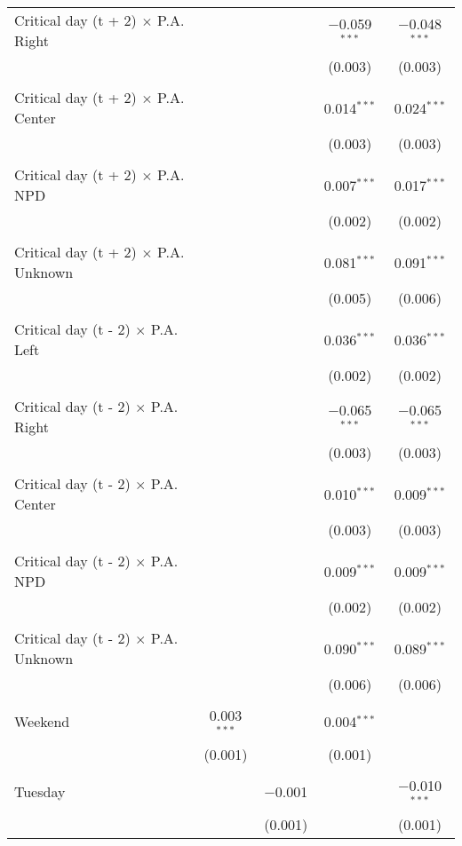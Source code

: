 \documentclass[
]{article}
\begin{document}
\begin{table}[!htbp]
{\begin{tabular}{@{\extracolsep{5pt}}lcccc}
 Critical day (t + 2) $\times$ P.A. Right &  &  & $-$0.059$^{***}$ & $-$0.048$^{***}$ \\ 
  &  &  & (0.003) & (0.003) \\ 
  & & & & \\ 
 Critical day (t + 2) $\times$ P.A. Center &  &  & 0.014$^{***}$ & 0.024$^{***}$ \\ 
  &  &  & (0.003) & (0.003) \\ 
  & & & & \\ 
 Critical day (t + 2) $\times$ P.A. NPD &  &  & 0.007$^{***}$ & 0.017$^{***}$ \\ 
  &  &  & (0.002) & (0.002) \\ 
  & & & & \\ 
 Critical day (t + 2) $\times$ P.A. Unknown &  &  & 0.081$^{***}$ & 0.091$^{***}$ \\ 
  &  &  & (0.005) & (0.006) \\ 
  & & & & \\ 
 Critical day (t - 2) $\times$ P.A. Left &  &  & 0.036$^{***}$ & 0.036$^{***}$ \\ 
  &  &  & (0.002) & (0.002) \\ 
  & & & & \\ 
 Critical day (t - 2) $\times$ P.A. Right &  &  & $-$0.065$^{***}$ & $-$0.065$^{***}$ \\ 
  &  &  & (0.003) & (0.003) \\ 
  & & & & \\ 
 Critical day (t - 2) $\times$ P.A. Center &  &  & 0.010$^{***}$ & 0.009$^{***}$ \\ 
  &  &  & (0.003) & (0.003) \\ 
  & & & & \\ 
 Critical day (t - 2) $\times$ P.A. NPD &  &  & 0.009$^{***}$ & 0.009$^{***}$ \\ 
  &  &  & (0.002) & (0.002) \\ 
  & & & & \\ 
 Critical day (t - 2) $\times$ P.A. Unknown &  &  & 0.090$^{***}$ & 0.089$^{***}$ \\ 
  &  &  & (0.006) & (0.006) \\ 
  & & & & \\ 
 Weekend & 0.003$^{***}$ &  & 0.004$^{***}$ &  \\ 
  & (0.001) &  & (0.001) &  \\ 
  & & & & \\ 
 Tuesday &  & $-$0.001 &  & $-$0.010$^{***}$ \\ 
  &  & (0.001) &  & (0.001) \\ 

\end{tabular}}
\end{table}
\end{document}
